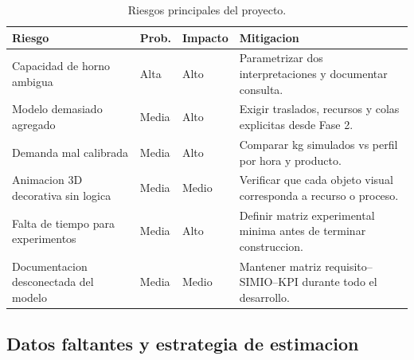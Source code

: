 \documentclass[12pt]{article}
\begin{document}
\begin{table}[H]
\centering
\caption{Riesgos principales del proyecto.}
\begin{tabularx}{\textwidth}{L{3.4cm}C{1.8cm}C{1.8cm}Y}
\toprule
{}
\color{white}Riesgo & \color{white}Prob. & \color{white}Impacto & \color{white}Mitigacion \\
\midrule
Capacidad de horno ambigua & Alta & Alto & Parametrizar dos interpretaciones y documentar consulta. \\
Modelo demasiado agregado & Media & Alto & Exigir traslados, recursos y colas explicitas desde Fase 2. \\
Demanda mal calibrada & Media & Alto & Comparar kg simulados vs perfil por hora y producto. \\
Animacion 3D decorativa sin logica & Media & Medio & Verificar que cada objeto visual corresponda a recurso o proceso. \\
Falta de tiempo para experimentos & Media & Alto & Definir matriz experimental minima antes de terminar construccion. \\
Documentacion desconectada del modelo & Media & Medio & Mantener matriz requisito--SIMIO--KPI durante todo el desarrollo. \\
\bottomrule
\end{tabularx}
\end{table}

\subsection{Datos faltantes y estrategia de estimacion}
\end{document}
